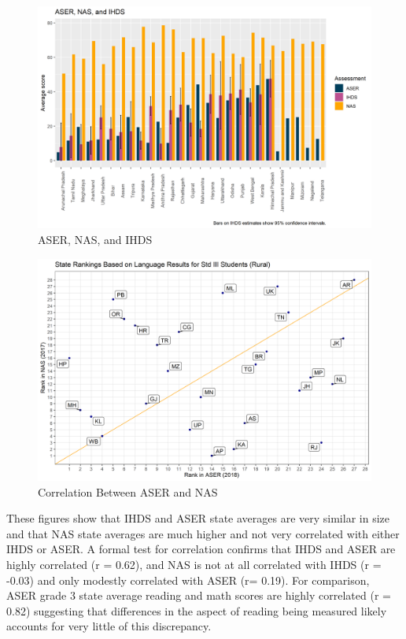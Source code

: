 \documentclass[
  11pt,
]{article}
\begin{document}
\begin{figure}

{\centering \includegraphics[width=1\linewidth]{aser_nas_ihds_values} 

}

\caption{ASER, NAS, and IHDS}\label{fig:asernasihds}
\end{figure}

\begin{figure}

{\centering \includegraphics[width=0.8\linewidth]{aser_nas_lang_ranking} 

}

\caption{Correlation Between ASER and NAS}\label{fig:correlations}
\end{figure}

These figures show that IHDS and ASER state averages are very similar in size and that NAS state averages are much higher and not very correlated with either IHDS or ASER. A formal test for correlation confirms that IHDS and ASER are highly correlated (r = 0.62), and NAS is not at all correlated with IHDS (r = -0.03) and only modestly correlated with ASER (r= 0.19). For comparison, ASER grade 3 state average reading and math scores are highly correlated (r = 0.82) suggesting that differences in the aspect of reading being measured likely accounts for very little of this discrepancy.
\end{document}
